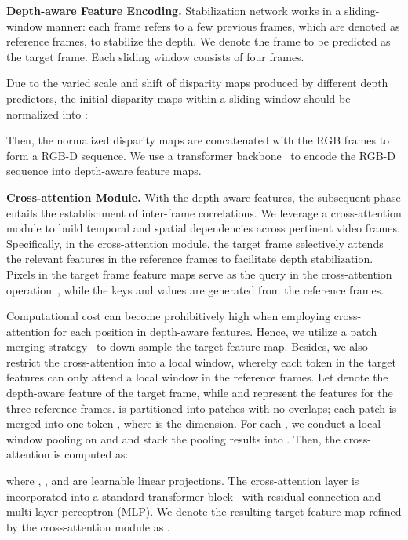 \documentclass[10pt,twocolumn,letterpaper]{article}
\def\Sbn{Stabilization network}
\begin{document}
\noindent \textbf{Depth-aware Feature Encoding.}
\Sbn{} works in a sliding-window manner: each frame refers to a few previous frames, which are denoted as reference frames, to stabilize the depth. We denote the frame to be predicted as the target frame. Each sliding window consists of four frames.

Due to the varied scale and shift of disparity maps produced by different depth predictors, the initial disparity maps within a sliding window  should be normalized into :


Then, the normalized disparity maps are concatenated with the RGB frames to form a RGB-D sequence. We use a transformer backbone~\cite{segformer} to encode the RGB-D sequence into depth-aware feature maps. 






\noindent \textbf{Cross-attention Module.}
With the depth-aware features, the subsequent phase entails the establishment of inter-frame correlations. We leverage a cross-attention module to build temporal and spatial dependencies across pertinent video frames.
Specifically, in the cross-attention module, the target frame selectively attends the relevant features in the reference frames to facilitate depth stabilization. Pixels in the target frame feature maps serve as the query in the cross-attention operation~\cite{transformer}, while the keys and values are generated from the reference frames.

Computational cost can become prohibitively high when employing cross-attention for each position in depth-aware features. Hence, we utilize a patch merging strategy~\cite{VIT} to down-sample the target feature map. Besides, we also restrict the cross-attention into a local window, whereby each token in the target features can only attend a local window in the reference frames. 
Let  denote the depth-aware feature of the target frame, while  and  represent the features for the three reference frames.  is partitioned into  patches with no overlaps; each patch is merged into one token  , where  is the dimension. For each , we conduct a local window pooling on  and  and stack the pooling results into . Then, the cross-attention is computed as:

where , , and  are learnable linear projections. The cross-attention layer is incorporated into a standard transformer block~\cite{transformer} with residual connection and multi-layer perceptron (MLP). We denote the resulting target feature map refined by the cross-attention module as . 
\end{document}
